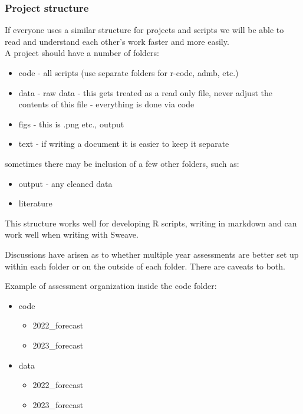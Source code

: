 \documentclass[
]{article}
\providecommand{\tightlist}{%
  \setlength{\itemsep}{0pt}\setlength{\parskip}{0pt}}
\begin{document}
\hypertarget{project-structure}{%
\subsubsection{Project structure}\label{project-structure}}

If everyone uses a similar structure for projects and scripts we will be
able to read and understand each other's work faster and more easily.\\
A project should have a number of folders:

\begin{itemize}
\tightlist
\item
  code - all scripts (use separate folders for r-code, admb, etc.)
\item
  data - raw data - this gets treated as a read only file, never adjust
  the contents of this file - everything is done via code
\item
  figs - this is .png etc., output
\item
  text - if writing a document it is easier to keep it separate
\end{itemize}

sometimes there may be inclusion of a few other folders, such as:

\begin{itemize}
\tightlist
\item
  output - any cleaned data
\item
  literature
\end{itemize}

This structure works well for developing R scripts, writing in markdown
and can work well when writing with Sweave.

Discussions have arisen as to whether multiple year assessments are
better set up within each folder or on the outside of each folder. There
are caveats to both.

Example of assessment organization inside the code folder:

\begin{itemize}
\item
  code

  \begin{itemize}
  \item
    2022\_forecast
  \item
    2023\_forecast
  \end{itemize}
\item
  data

  \begin{itemize}
  \item
    2022\_forecast
  \item
    2023\_forecast
  \end{itemize}
\end{itemize}
\end{document}
